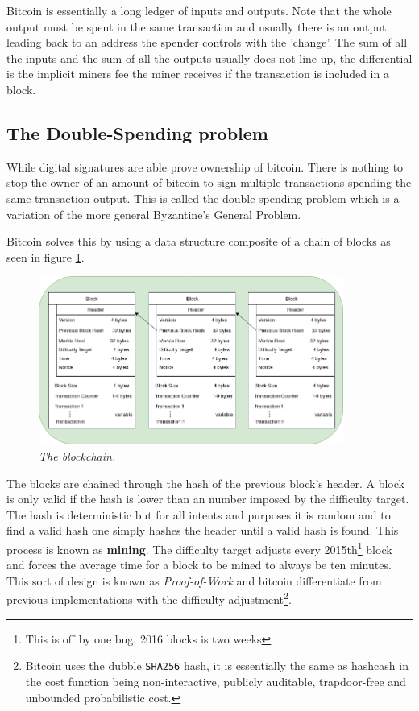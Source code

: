Bitcoin is essentially a long ledger of inputs and outputs. Note that the whole output must be spent in the same transaction and usually there is an output leading back to an address the spender controls with the 'change'. The sum of all the inputs and the sum of all the outputs usually does not line up, the differential is the implicit miners fee the miner receives if the transaction is included in a block. 

\subsection{The Double-Spending problem}

While digital signatures are able prove ownership of bitcoin. There is nothing to stop the owner of an amount of bitcoin to sign multiple transactions spending the same transaction output. This is called the double-spending problem which is a variation of the more general Byzantine's General Problem.

Bitcoin solves this by using a data structure composite of a chain of blocks as seen in figure \ref{fig:blockchain}.

\begin{figure}[!htb]
	\hspace*{-2cm} 
	\centering
	\includegraphics[width=10cm]{blockchain.png}
	\caption{\textit{The blockchain. 
	}}
	\label{fig:blockchain}
	\hspace{2mm} 
\end{figure}

The blocks are chained through the hash of the previous block's header. A block is only valid if the hash is lower than an number imposed by the difficulty target. The hash is deterministic but for all intents and purposes it is random and to find a valid hash one simply hashes the header until a valid hash is found. This process is known as \textbf{mining}. The difficulty target adjusts every 2015th\footnote{This is off by one bug, 2016 blocks is two weeks} block\cite{repository:bitcoin} and forces the average time for a block to be mined to always be ten minutes. This sort of design is known as \textit{Proof-of-Work} and bitcoin differentiate from previous implementations with the difficulty adjustment\cite{back:hashcash}\footnote{Bitcoin uses the dubble \texttt{SHA256} hash, it is essentially the same as hashcash in the cost function being non-interactive, publicly auditable, trapdoor-free and unbounded probabilistic cost\cite{back:hashcash}.}.

